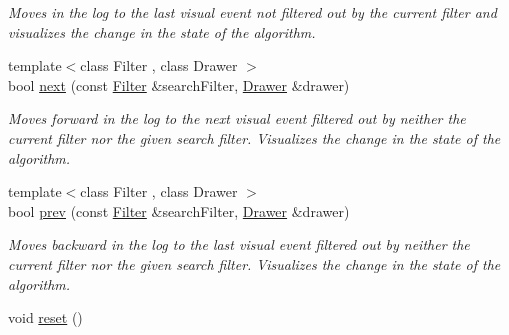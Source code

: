 \begin{DoxyCompactItemize}
\begin{DoxyCompactList}\small\item\em Moves in the log to the last visual event not filtered out by the current filter and visualizes the change in the state of the algorithm. \end{DoxyCompactList}\item 
{\footnotesize template$<$class Filter , class Drawer $>$ }\\bool \hyperlink{structslb_1_1core_1_1ui_1_1VisualLog_af82cf2fad1bbe4c8b7786c25884311cf}{next} (const \hyperlink{structslb_1_1core_1_1ui_1_1Filter}{Filter} \&search\+Filter, \hyperlink{structslb_1_1core_1_1ui_1_1Drawer}{Drawer} \&drawer)
\begin{DoxyCompactList}\small\item\em Moves forward in the log to the next visual event filtered out by neither the current filter nor the given search filter. Visualizes the change in the state of the algorithm. \end{DoxyCompactList}\item 
{\footnotesize template$<$class Filter , class Drawer $>$ }\\bool \hyperlink{structslb_1_1core_1_1ui_1_1VisualLog_a903662cc508237d0ee3c36858476ab34}{prev} (const \hyperlink{structslb_1_1core_1_1ui_1_1Filter}{Filter} \&search\+Filter, \hyperlink{structslb_1_1core_1_1ui_1_1Drawer}{Drawer} \&drawer)
\begin{DoxyCompactList}\small\item\em Moves backward in the log to the last visual event filtered out by neither the current filter nor the given search filter. Visualizes the change in the state of the algorithm. \end{DoxyCompactList}\item 
void \hyperlink{structslb_1_1core_1_1ui_1_1VisualLog_aa03dc8555f526a793d7cb3ff2410b5ac}{reset} ()\hypertarget{structslb_1_1core_1_1ui_1_1VisualLog_aa03dc8555f526a793d7cb3ff2410b5ac}{}\label{structslb_1_1core_1_1ui_1_1VisualLog_aa03dc8555f526a793d7cb3ff2410b5ac}


\end{DoxyCompactItemize}
